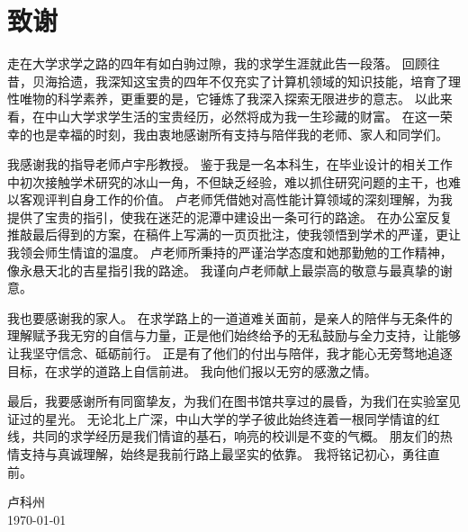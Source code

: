
\chapter{致谢}

走在大学求学之路的四年有如白驹过隙，我的求学生涯就此告一段落。
回顾往昔，贝海拾遗，我深知这宝贵的四年不仅充实了计算机领域的知识技能，培育了理性唯物的科学素养，更重要的是，它锤炼了我深入探索无限进步的意志。
以此来看，在中山大学求学生活的宝贵经历，必然将成为我一生珍藏的财富。
在这一荣幸的也是幸福的时刻，我由衷地感谢所有支持与陪伴我的老师、家人和同学们。  

我感谢我的指导老师卢宇彤教授。
鉴于我是一名本科生，在毕业设计的相关工作中初次接触学术研究的冰山一角，不但缺乏经验，难以抓住研究问题的主干，也难以客观评判自身工作的价值。
卢老师凭借她对高性能计算领域的深刻理解，为我提供了宝贵的指引，使我在迷茫的泥潭中建设出一条可行的路途。
在办公室反复推敲最后得到的方案，在稿件上写满的一页页批注，使我领悟到学术的严谨，更让我领会师生情谊的温度。
卢老师所秉持的严谨治学态度和她那勤勉的工作精神，像永悬天北的吉星指引我的路途。
我谨向卢老师献上最崇高的敬意与最真挚的谢意。 

我也要感谢我的家人。
在求学路上的一道道难关面前，是亲人的陪伴与无条件的理解赋予我无穷的自信与力量，正是他们始终给予的无私鼓励与全力支持，让能够让我坚守信念、砥砺前行。
正是有了他们的付出与陪伴，我才能心无旁骛地追逐目标，在求学的道路上自信前进。
我向他们报以无穷的感激之情。

最后，我要感谢所有同窗挚友，为我们在图书馆共享过的晨昏，为我们在实验室见证过的星光。
无论北上广深，中山大学的学子彼此始终连着一根同学情谊的红线，共同的求学经历是我们情谊的基石，响亮的校训是不变的气概。
朋友们的热情支持与真诚理解，始终是我前行路上最坚实的依靠。
我将铭记初心，勇往直前。

\vskip 108pt
\begin{flushright}
	卢科州\makebox[1cm]{} \\
	\today
\end{flushright}

